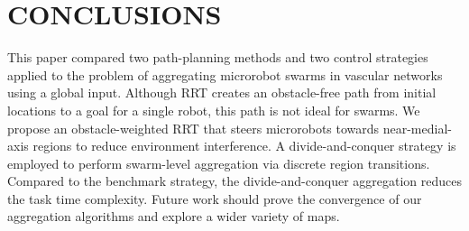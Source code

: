\documentclass[letterpaper, 10 pt, conference]{ieeeconf}  %
\begin{document}

%
%


%

%





\section{CONCLUSIONS}
This paper compared two path-planning methods and two control strategies applied to the problem of aggregating microrobot swarms in vascular networks using a global input. 
Although RRT creates an obstacle-free path from initial locations to a goal for a single robot, this path is not ideal for swarms. 
We propose an obstacle-weighted RRT that steers microrobots towards near-medial-axis regions to reduce environment interference.   
A divide-and-conquer strategy is employed to perform swarm-level aggregation via discrete region transitions. 
Compared to the benchmark strategy, the divide-and-conquer aggregation reduces the task time complexity.    
Future work should prove the convergence of our aggregation algorithms and explore a wider variety of maps.  

\addtolength{\textheight}{-12cm}   %







%
%
%
\end{document}
